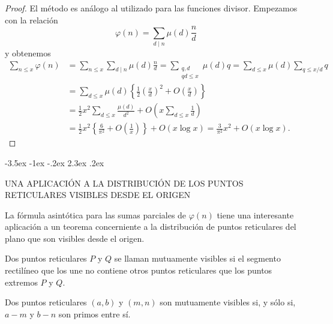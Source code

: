 \documentclass[12pt,a4paper]{book}
\makeatletter
\renewcommand\section{\@startsection{section}{1}{\z@}%
  {-3.5ex \@plus -1ex \@minus -.2ex}%
  {2.3ex \@plus .2ex}%
  {\normalfont\Large\bfseries\raggedright}}
\makeatother
\begin{document}
    \begin{proof}
        El método es análogo al utilizado para las funciones divisor. Empezamos con la
        relación
        \begin{equation*}
            \varphi(n)=\sum_{d\mid n}\mu(d)\frac{n}{d}
        \end{equation*}
        y obtenemos
        \begin{align*}
            \sum_{n\leq x}\varphi(n)&=\sum_{n\leq x}\sum_{d\mid n}\mu(d)\frac{n}{d}
            =\sum_{\substack{q,d\\ qd\leq x}}\mu(d)q=\sum_{d\leq x}\mu(d)\sum_{q\leq x/d}q\\
            &=\sum_{d\leq x}\mu(d)\left\{\frac{1}{2}\left(\frac{x}{d}\right)^{2}+O\left(\frac{x}{d}\right)\right\}\\
            &=\frac{1}{2}x^{2}\sum_{d\leq x}\frac{\mu(d)}{d^{2}}+O\left(x\sum_{d\leq x}\frac{1}{d}\right)\\
            &=\frac{1}{2}x^{2}\left\{\frac{6}{\pi^{2}}+O\left(\frac{1}{x}\right)\right\}+O(x\log x)
            =\frac{3}{\pi^{2}}x^{2}+O(x\log x).
        \end{align*}
    \end{proof}

    \section{UNA APLICACIÓN A LA DISTRIBUCIÓN DE LOS PUNTOS RETICULARES VISIBLES DESDE EL
    ORIGEN}

    La fórmula asintótica para las sumas parciales de $\varphi(n)$ tiene una interesante
    aplicación a un teorema concerniente a la distribución de puntos reticulares del plano
    que son visibles desde el origen.

    \begin{definicion}
        Dos puntos reticulares $P$ y $Q$ se llaman mutuamente visibles si el segmento
        rectilíneo que los une no contiene otros puntos reticulares que los puntos
        extremos $P$ y $Q$.
    \end{definicion}

    \begin{teorema}
        Dos puntos reticulares $(a,b)$ y $(m,n)$ son mutuamente visibles si, y sólo si,
        $a-m$ y $b-n$ son primos entre sí.
    \end{teorema}
\end{document}
